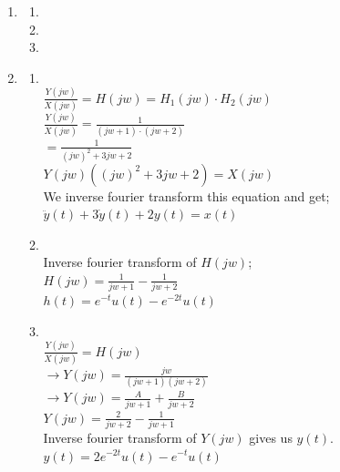 \documentclass[10pt,a4paper, margin=1in]{article}
\begin{document}
\begin{enumerate}
    \item %
          \begin{enumerate}
              \item %
              \item %
              \item %
          \end{enumerate}

    \item %
          \begin{enumerate}
              \item~\\
              $\frac{Y(jw)}{X(jw)}=H(jw)=H_1(jw)\cdot H_2(jw)$\\
              $\frac{Y(jw)}{X(jw)} = \frac{1}{(jw+1)\cdot(jw+2)}$\\
              $=\frac{1}{(jw)^2+3jw+2}$\\
              $Y(jw)((jw)^2+3jw+2) = X(jw)$\\
              We inverse fourier transform this equation and get;\\
              $\ddot{y}(t)+3\dot{y}(t)+2y(t) = x(t)$\\
              \item~\\Inverse fourier transform of $H(jw)$;\\
              $H(jw) = \frac{1}{jw+1} - \frac{1}{jw+2}$\\
              $h(t) = e^{-t}u(t) -e^{-2t}u(t)$\\
              \item~\\ $\frac{Y(jw)}{X(jw)} = H(jw)$\\
              $\rightarrow Y(jw) = \frac{jw}{(jw+1)(jw+2)}$\\
              $\rightarrow Y(jw) = \frac{A}{jw+1} + \frac{B}{jw+2}$\\
              $Y(jw) = \frac{2}{jw+2} - \frac{1}{jw+1}$\\
              Inverse fourier transform of $Y(jw)$ gives us $y(t)$.\\
              $y(t) = 2e^{-2t}u(t)-e^{-t}u(t)$\\
          \end{enumerate}


\end{enumerate}
\end{document}
